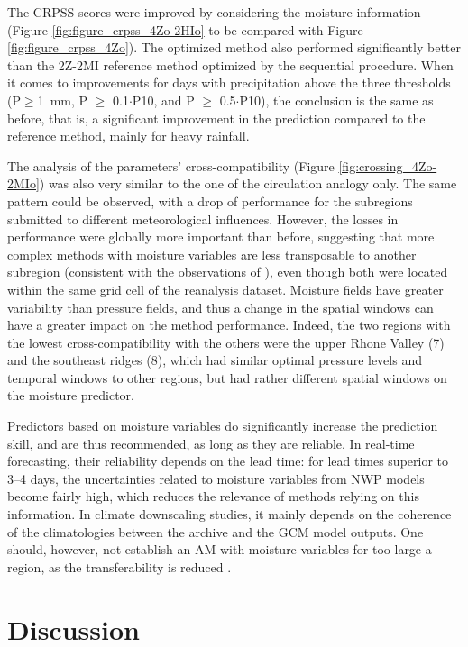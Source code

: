 \documentclass[review]{elsarticle}
\begin{document}
The CRPSS scores were improved by considering the moisture information (Figure \ref{fig:figure_crpss_4Zo-2HIo} to be compared with Figure \ref{fig:figure_crpss_4Zo}). The optimized method also performed significantly better than the 2Z-2MI reference method optimized by the sequential procedure. When it comes to improvements for days with precipitation above the three thresholds (P\(\geq\)1~mm, P \(\geq\) 0.1\(\cdot\)P10, and P \(\geq\) 0.5\(\cdot\)P10), the conclusion is the same as before, that is, a significant improvement in the prediction compared to the reference method, mainly for heavy rainfall.

The analysis of the parameters’ cross-compatibility (Figure \ref{fig:crossing_4Zo-2MIo}) was also very similar to the one of the circulation analogy only. The same pattern could be observed, with a drop of performance for the subregions submitted to different meteorological influences. However, the losses in performance were globally more important than before, suggesting that more complex methods with moisture variables are less transposable to another subregion (consistent with the observations of \citet{Chardon2014}), even though both were located within the same grid cell of the reanalysis dataset. Moisture fields have greater variability than pressure fields, and thus a change in the spatial windows can have a greater impact on the method performance. Indeed, the two regions with the lowest cross-compatibility with the others were the upper Rhone Valley (7) and the southeast ridges (8), which had similar optimal pressure levels and temporal windows to other regions, but had rather different spatial windows on the moisture predictor.

Predictors based on moisture variables do significantly increase the prediction skill, and are thus recommended, as long as they are reliable. In real-time forecasting, their reliability depends on the lead time: for lead times superior to 3--4 days, the uncertainties related to moisture variables from NWP models become fairly high, which reduces the relevance of methods relying on this information. In climate downscaling studies, it mainly depends on the coherence of the climatologies between the archive and the GCM model outputs. One should, however, not establish an AM with moisture variables for too large a region, as the transferability is reduced \citep[see][for alternative approaches]{Chardon2014}.


\section{Discussion}
\label{sec:discussion}
\end{document}
